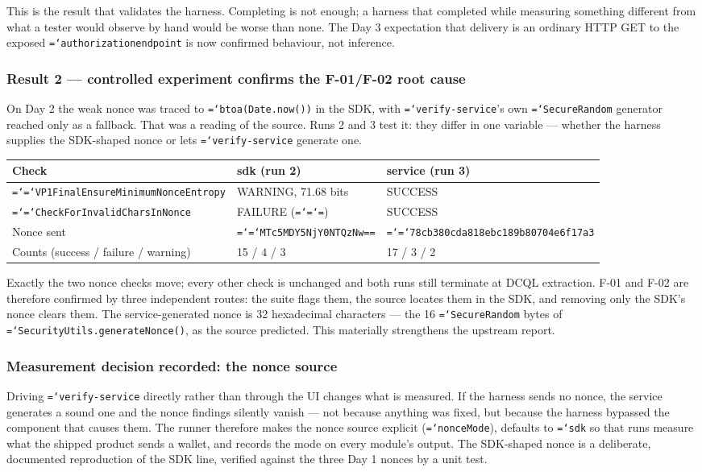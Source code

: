\documentclass[11pt,a4paper]{article}
\let\origtexttt\texttt
\renewcommand{\texttt}[1]{\origtexttt{\hyphenchar\font=`\-\relax #1}}
\renewcommand{\_}{\textunderscore\allowbreak}
\begin{document}
This is the result that validates the harness. Completing is not enough; a harness that
completed while measuring something different from what a tester would observe by hand
would be worse than none. The Day 3 expectation that delivery is an ordinary HTTP GET to
the exposed \texttt{authorization\_endpoint} is now confirmed behaviour, not inference.

\subsubsection*{Result 2 --- controlled experiment confirms the F-01/F-02 root cause}
On Day 2 the weak nonce was traced to \texttt{btoa(Date.now())} in the SDK, with
\texttt{verify-service}'s own \texttt{SecureRandom} generator reached only as a fallback. That
was a reading of the source. Runs 2 and 3 test it: they differ in one variable --- whether
the harness supplies the SDK-shaped nonce or lets \texttt{verify-service} generate one.

\begin{longtable}{p{5.4cm} p{4.2cm} p{4.2cm}}
\hline
\textbf{Check} & \textbf{sdk (run 2)} & \textbf{service (run 3)}\\
\hline
\endhead
\texttt{VP1FinalEnsureMinimumNonceEntropy} & WARNING, 71.68 bits & SUCCESS\\
\texttt{CheckForInvalidCharsInNonce} & FAILURE (\texttt{=}) & SUCCESS\\
Nonce sent & \texttt{MTc5MDY5NjY0NTQzNw==} & \texttt{78cb380cda818ebc189b80704e6f17a3}\\
Counts (success / failure / warning) & 15 / 4 / 3 & 17 / 3 / 2\\
\hline
\end{longtable}

Exactly the two nonce checks move; every other check is unchanged and both runs still
terminate at DCQL extraction. F-01 and F-02 are therefore confirmed by three independent
routes: the suite flags them, the source locates them in the SDK, and removing only the
SDK's nonce clears them. The service-generated nonce is 32 hexadecimal characters --- the
16 \texttt{SecureRandom} bytes of \texttt{SecurityUtils.generateNonce()}, as the source
predicted. This materially strengthens the upstream report.

\subsubsection*{Measurement decision recorded: the nonce source}
Driving \texttt{verify-service} directly rather than through the UI changes what is measured.
If the harness sends no nonce, the service generates a sound one and the nonce findings
silently vanish --- not because anything was fixed, but because the harness bypassed the
component that causes them. The runner therefore makes the nonce source explicit
(\texttt{nonceMode}), defaults to \texttt{sdk} so that runs measure what the shipped product
sends a wallet, and records the mode on every module's output. The SDK-shaped nonce is a
deliberate, documented reproduction of the SDK line, verified against the three Day 1
nonces by a unit test.
\end{document}
